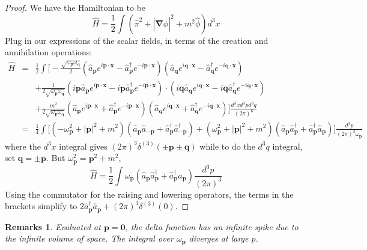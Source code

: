 \documentclass[a4paper]{article}
\newtheorem{remarks}{Remarks}[section]
\theoremstyle{new}
\begin{document}
\begin{proof}
We have the Hamiltonian to be
$$\hat{H}=\frac{1}{2}\int(\hat{\pi}^2+|\boldsymbol{\nabla}\hat{\phi}|^2+m^2\hat{\phi})d^3x$$
Plug in our expressions of the scalar fields, in terms of the creation and annihilation operations:
\begin{eqnarray}
    \hat{H}&=&\frac{1}{2}\int\bigg[-\frac{\sqrt{\omega_{\mathbf{p}}\omega_{\mathbf{q}}}}{2}(\hat{a}_{\mathbf{p}}e^{i\mathbf{p}\cdot\mathbf{x}}-\hat{a}_{\mathbf{p}}^\dag e^{-i\mathbf{p}\cdot\mathbf{x}})(\hat{a}_{\mathbf{q}}e^{i\mathbf{q}\cdot\mathbf{x}}-\hat{a}^\dag_{\mathbf{q}}e^{-i\mathbf{q}\cdot\mathbf{x}})\nonumber\\&&+\frac{1}{2\sqrt{\omega_{\mathbf{p}}\omega_{\mathbf{q}}}}(i\mathbf{p}\hat{a}_{\mathbf{p}}e^{i\mathbf{p}\cdot\mathbf{x}}-i\mathbf{p}\hat{a}^\dag_{\mathbf{p}}e^{-i\mathbf{p}\cdot\mathbf{x}})\cdot(i\mathbf{q}\hat{a}_{\mathbf{q}}e^{i\mathbf{q}\cdot\mathbf{x}}-i\mathbf{q}\hat{a}_{\mathbf{q}}^\dag e^{-i\mathbf{q}\cdot\mathbf{x}})\nonumber\\&&+\frac{m^2}{2\sqrt{\omega_{\mathbf{p}}\omega_{\mathbf{q}}}}(\hat{a}_{\mathbf{p}}e^{i\mathbf{p}\cdot\mathbf{x}}+\hat{a}_{\mathbf{p}}^\dag e^{-i\mathbf{p}\cdot\mathbf{x}})(\hat{a}_{\mathbf{q}}e^{i\mathbf{q}\cdot\mathbf{x}}+\hat{a}_{\mathbf{q}}^\dag e^{-i\mathbf{q}\cdot\mathbf{x}})\bigg]\frac{d^3xd^3pd^3q}{(2\pi)^6}\nonumber\\&=&\frac{1}{4}\int\bigg[(-\omega_{\mathbf{p}}^2+|\mathbf{p}|^2+m^2)(\hat{a}_{\mathbf{p}}\hat{a}_{-\mathbf{p}}+\hat{a}_{\mathbf{p}}^\dag\hat{a}_{-\mathbf{p}}^\dag)+(\omega_{\mathbf{p}}^2+|\mathbf{p}|^2+m^2)(\hat{a}_{\mathbf{p}}\hat{a}_{\mathbf{p}}^\dag+\hat{a}_{\mathbf{p}}^\dag\hat{a}_{\mathbf{p}})\bigg]\frac{d^3p}{(2\pi)^3\omega_{\mathbf{p}}}\nonumber
\end{eqnarray}
where the $d^3x$ integral gives $(2\pi)^3\delta^{(3)}(\pm\mathbf{p}\pm\mathbf{q})$ while to do the $d^3q$ integral, set $\mathbf{q}=\pm\mathbf{p}$. But $\omega_{\mathbf{p}}^2=\mathbf{p}^2+m^2$,
$$\hat{H}=\frac{1}{2}\int\omega_{\mathbf{p}}(\hat{a}_{\mathbf{p}}\hat{a}_{\mathbf{p}}^\dag+\hat{a}_{\mathbf{p}}^\dag\hat{a}_{\mathbf{p}})\frac{d^3p}{(2\pi)^3}$$
Using the commutator for the raising and lowering operators, the terms in the brackets simplify to $2\hat{a}_{\mathbf{p}}^\dag\hat{a}_{\mathbf{p}}+(2\pi)^3\delta^{(3)}(0)$. 
\end{proof}
\begin{remarks}
Evaluated at $\mathbf{p}=\boldsymbol{0}$, the delta function has an infinite spike due to the infinite volume of space. The integral over $\omega_{\mathbf{p}}$ diverges at large $p$. 
\end{remarks}
\newpage
\end{document}
